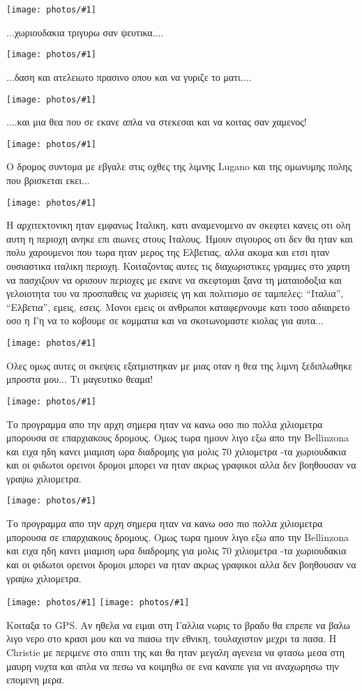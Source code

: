 \documentclass[]{book}
\newcommand\photo[1]{\noindent\texttt{[image: photos/\#1]}}
\begin{document}
\photo{27.jpg}

...χωριουδακια τριγυρω σαν ψευτικα....

\photo{28.jpg}

...δαση και ατελειωτο πρασινο οπου και να γυριζε το ματι....

\photo{29.jpg}

....και μια θεα που σε εκανε απλα να στεκεσαι και να κοιτας σαν χαμενος!

\photo{30.jpg}

Ο δρομος συντομα με εβγαλε στις οχθες της λιμνης Lugano και της ομωνυμης πολης που βρισκεται εκει...

\photo{31.jpg}

Η αρχιτεκτονικη ηταν εμφανως Ιταλικη, κατι αναμενομενο αν σκεφτει κανεις οτι ολη αυτη η περιοχη ανηκε επι αιωνες στους Ιταλους. Ημουν σιγουρος οτι δεν θα ηταν και πολυ χαρουμενοι που τωρα ηταν μερος της Ελβετιας, αλλα ακομα και ετσι ηταν ουσιαστικα ιταλικη περιοχη. 
Κοιταζοντας αυτες τις διαχωριστικες γραμμες στο χαρτη να πασχιζουν να ορισουν περιοχες με εκανε να σκεφτομαι ξανα τη ματαιοδοξια και γελοιοτητα του να προσπαθεις να χωρισεις γη και πολιτισμο σε ταμπελες: ``Ιταλια'', ``Ελβετια'', εμεις, εσεις. Μονοι εμεις οι ανθρωποι καταφερνουμε κατι τοσο αδιαιρετο οσο η Γη να το κοβουμε σε κομματια και να σκοτωνομαστε κιολας για αυτα...

\photo{32.jpg}

Ολες ομως αυτες οι σκεψεις εξατμιστηκαν με μιας οταν η θεα της λιμνη ξεδιπλωθηκε μπροστα μου... 
Τι μαγευτικο θεαμα!

\photo{33.jpg}

Το προγραμμα απο την αρχη σημερα ηταν να κανω οσο πιο πολλα χιλιομετρα μπορουσα σε επαρχιακους δρομους. 
Ομως τωρα ημουν λιγο εξω απο την Bellinzona και ειχα ηδη κανει μιαμιση ωρα διαδρομης για μολις 70 χιλιομετρα -τα χωριουδακια και οι φιδωτοι ορεινοι δρομοι μπορει να ηταν ακρως γραφικοι αλλα δεν βοηθουσαν να γραψω χιλιομετρα.

\photo{34.jpg}

Το προγραμμα απο την αρχη σημερα ηταν να κανω οσο πιο πολλα χιλιομετρα μπορουσα σε επαρχιακους δρομους. 
Ομως τωρα ημουν λιγο εξω απο την Bellinzona και ειχα ηδη κανει μιαμιση ωρα διαδρομης για μολις 70 χιλιομετρα -τα χωριουδακια και οι φιδωτοι ορεινοι δρομοι μπορει να ηταν ακρως γραφικοι αλλα δεν βοηθουσαν να γραψω χιλιομετρα.

\photo{35.jpg}
\photo{36.jpg}

Κοιταξα το GPS. Αν ηθελα να ειμαι στη Γαλλια νωρις το βραδυ θα επρεπε να βαλω λιγο νερο στο κρασι μου και να πιασω την εθνικη, τουλαχιστον μεχρι τα πασα. Η Christie με περιμενε στο σπιτι της και θα ηταν μεγαλη αγενεια να φτασω μεσα στη μαυρη νυχτα και απλα να πεσω να κοιμηθω σε ενα καναπε για να αναχωρησω την επομενη μερα.
\end{document}

